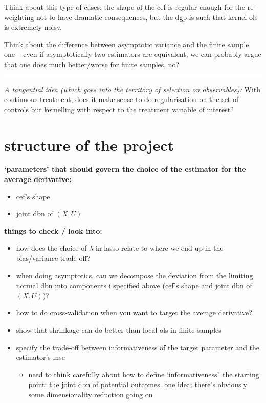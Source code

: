 \documentclass[a4paper,12pt,twoside]{article}
\begin{document}
Think about this type of cases: the shape of the cef is regular enough for the re-weighting not to have dramatic consequences, but the dgp is such that kernel ols is extremely noisy.

Think about the difference between asymptotic variance and the finite sample one -- even if asymptotically two estimators are equivalent, we can probably argue that one does much better/worse for finite samples, no?


\noindent\rule{\textwidth}{0.5pt}

\textit{A tangential idea (which goes into the territory of selection on observables):} With continuous treatment, does it make sense to do regularisation on the set of controls but kernelling with respect to the treatment variable of interest?


\section*{structure of the project}

\textbf{`parameters' that should govern the choice of the estimator for the average derivative:}

\begin{itemize}
  \item cef's shape
  \item joint dbn of $(X, U)$
\end{itemize}


\textbf{things to check / look into:}

\begin{itemize}
  \item how does the choice of $\lambda$ in lasso relate to where we end up in the bias/variance trade-off?
  \item when doing asymptotics, can we decompose the deviation from the limiting normal dbn into components i specified above (cef's shape and joint dbn of $(X, U)$)?
  \item how to do cross-validation when you want to target the average derivative?
  \item show that shrinkage can do better than local ols in finite samples
  \item specify the trade-off between informativeness of the target parameter and the estimator's mse
	\begin{itemize}
	  \item need to think carefully about how to define `informativeness'. the starting point: the joint dbn of potential outcomes. one idea: there's obviously some dimensionality reduction going on
	\end{itemize}
\end{itemize}
\end{document}
